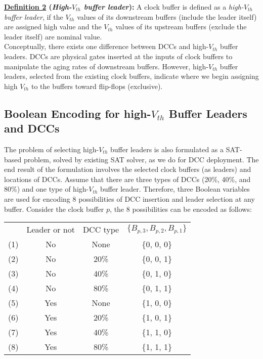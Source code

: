 \noindent \textbf{\uline{Definition 2} (\textit{High-$V_{th}$ buffer leader}):} A clock buffer is defined as a \textit{high-$V_{th}$ buffer leader}, if the $V_{th}$ values of its downstream buffers (include the leader itself) are assigned high value and the $V_{th}$ values of its upstream buffers (exclude the leader itself) are nominal value.\\

Conceptually, there exists one difference between DCCs and high-$V_{th}$ buffer leaders. DCCs are physical gates inserted at the inputs of clock buffers to manipulate the aging rates of downstream buffers. However, high-$V_{th}$ buffer leaders, selected from the existing clock buffers, indicate where we begin assigning high $V_{th}$ to the buffers toward flip-flops (exclusive).

\subsection{Boolean Encoding for high-$V_{th}$ Buffer Leaders and DCCs}
The problem of selecting high-$V_{th}$ buffer leaders is also formulated as a SAT-based problem, solved by existing SAT solver, as we do for DCC deployment. The end result of the formulation involves the selected clock buffers (as leaders) and locations of DCCs. Assume that there are three types of DCCs (20\%, 40\%, and 80\%) and one type of high-$V_{th}$ buffer leader. Therefore, three Boolean variables are used for encoding 8 possibilities of DCC insertion and leader selection at any buffer. Consider the clock buffer $p$, the 8 possibilities can be encoded as follows:
{\small
\begin{tabular}{  c  c  c  c  }
  	 & Leader or not & DCC type & $\{B_{p,3}, B_{p,2}, B_{p,1}\}$ \\ 
  	(1)\quad & No & None & \{0, 0, 0\} \\ 
  	(2)\quad & No &20\% &  \{0, 0, 1\} \\ 
  	(3)\quad & No &40\% &  \{0, 1, 0\} \\ 
  	(4)\quad & No &80\% &  \{0, 1, 1\} \\ 
	(5)\quad & Yes & None & \{1, 0, 0\} \\ 
  	(6)\quad & Yes & 20\% &  \{1, 0, 1\} \\ 
  	(7)\quad & Yes & 40\% &  \{1, 1, 0\} \\ 
  	(8)\quad & Yes & 80\% &  \{1, 1, 1\} \\ 
\end{tabular}}

